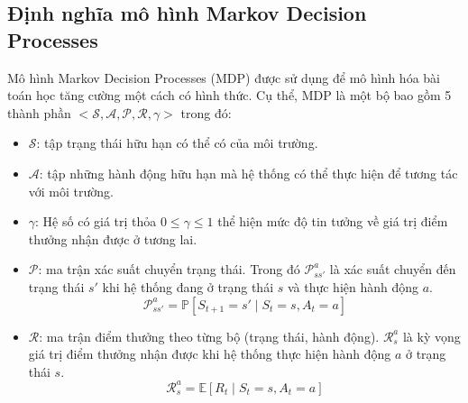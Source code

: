 \subsection{Định nghĩa mô hình Markov Decision Processes}
Mô hình Markov Decision Processes (MDP) được sử dụng để mô hình hóa bài toán học tăng cường một cách có hình thức. Cụ thể, MDP là một bộ bao gồm 5 thành phần $<\mathcal{S, A, P, R, \gamma}>$ trong đó:
\begin{itemize}
	\item $\mathcal{S}$: tập trạng thái hữu hạn có thể có của môi trường.
	\item $\mathcal{A}$: tập những hành động hữu hạn mà hệ thống có thể thực hiện để tương tác với môi trường.
	\item $\gamma$: Hệ số có giá trị thỏa $0\leqslant \gamma \leqslant 1$ thể hiện mức độ tin tưởng về giá trị điểm thưởng nhận được ở tương lai.
	\item $\mathcal{P}$: ma trận xác suất chuyển trạng thái. Trong đó $\mathcal{P}_{ss'}^{a}$ là xác suất chuyển đến trạng thái $s'$ khi hệ thống đang ở trạng thái $s$ và thực hiện hành động $a$.
	\begin{equation}
	\mathcal{P}_{ss'}^{a} = \mathbb{P}[\mathit{S_{t+1}} = s' \mid \mathit{S_{t}} = s, \mathit{A_{t}} = a]
	\end{equation}
	\item $\mathcal{R}$: ma trận điểm thưởng theo từng bộ (trạng thái, hành động). $\mathcal{R}_{s}^a$ là kỳ vọng giá trị điểm thưởng nhận được khi hệ thống thực hiện hành động $a$ ở trạng thái $s$.
	\begin{equation}
	\mathcal{R}_{s}^a = \mathbb{E}[\mathit{R_{t}} \mid \mathit{S_{t}} = s, \mathit{A_{t}} = a]
	\end{equation}				
\end{itemize}

